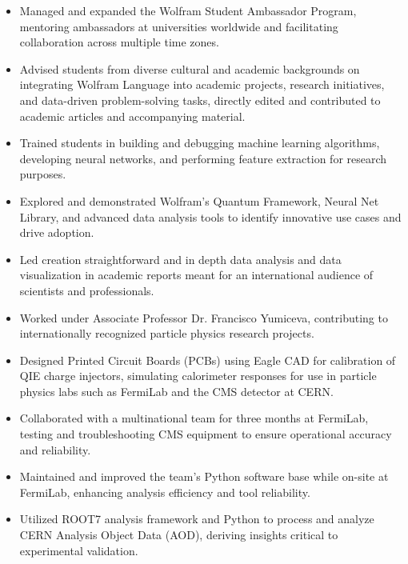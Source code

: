 \documentclass[10pt,a4paper,ragged2e,withhyper]{altacv}
\begin{document}
\begin{paracol}{2}
\begin{itemize}
    \item Managed and expanded the Wolfram Student Ambassador Program, mentoring ambassadors at universities worldwide and facilitating collaboration across multiple time zones.
    \item Advised students from diverse cultural and academic backgrounds on integrating Wolfram Language into academic projects, research initiatives, and data-driven problem-solving tasks, directly edited and contributed to academic articles and accompanying material.
    \item Trained students in building and debugging machine learning algorithms, developing neural networks, and performing feature extraction for research purposes.
    \item Explored and demonstrated Wolfram's Quantum Framework, Neural Net Library, and advanced data analysis tools to identify innovative use cases and drive adoption.
    \item Led creation straightforward and in depth data analysis and data visualization in academic reports meant for an international audience of scientists and professionals.
\end{itemize}
\begin{itemize}
    \item Worked under Associate Professor Dr. Francisco Yumiceva, contributing to internationally recognized particle physics research projects.
    \item Designed Printed Circuit Boards (PCBs) using Eagle CAD for calibration of QIE charge injectors, simulating calorimeter responses for use in particle physics labs such as FermiLab and the CMS detector at CERN.
    \item Collaborated with a multinational team for three months at FermiLab, testing and troubleshooting CMS equipment to ensure operational accuracy and reliability.
    \item Maintained and improved the team's Python software base while on-site at FermiLab, enhancing analysis efficiency and tool reliability.
    \item Utilized ROOT7 analysis framework and Python to process and analyze CERN Analysis Object Data (AOD), deriving insights critical to experimental validation.



\end{itemize}
\end{paracol}
\end{document}
